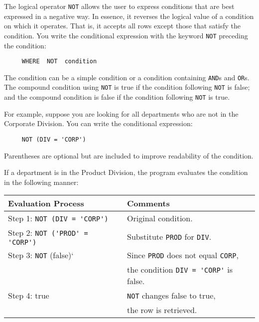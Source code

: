 The logical operator {\tt NOT} allows the user to express conditions that
are best expressed in a negative way.  In essence, it reverses the
logical value of a condition on which it operates.  That is, it
accepts all rows except those that satisfy the condition.  You write
the conditional expression with the keyword {\tt NOT} preceding the
condition:
\begin{verbatim}
     WHERE  NOT  condition
\end{verbatim}

The condition can be a simple condition or a condition containing
{\tt AND}s and {\tt OR}s.  The compound condition using {\tt NOT} is true if the
condition following {\tt NOT} is false; and the compound condition is false
if the condition following {\tt NOT} is true.

For example, suppose you are looking for all departments who are not
in the Corporate Division.  You can write the conditional expression:
\begin{verbatim}
     NOT (DIV = 'CORP')
\end{verbatim}
Parentheses are optional but are included to improve readability of
the condition.

If a department is in the Product Division, the program evaluates the
condition in the following manner:

\begin{center}
\begin{tabular}{|l|l|} \hline
Evaluation Process                     & Comments                                        \\ \hline\hline
Step 1:  \verb`NOT (DIV = 'CORP')`     & Original condition.                             \\ \hline
Step 2:  \verb`NOT ('PROD' = 'CORP')`  & Substitute \verb`PROD` for \verb`DIV`.          \\ \hline
Step 3:  \verb`NOT` (false)`           & Since \verb`PROD` does not equal \verb`CORP`,   \\
                                       & the condition \verb`DIV = 'CORP'` is false.     \\ \hline
Step 4:  true                          & {\tt NOT} changes false to true,                      \\
                                       & the row is retrieved.                           \\ \hline
\end{tabular}
\end{center}


